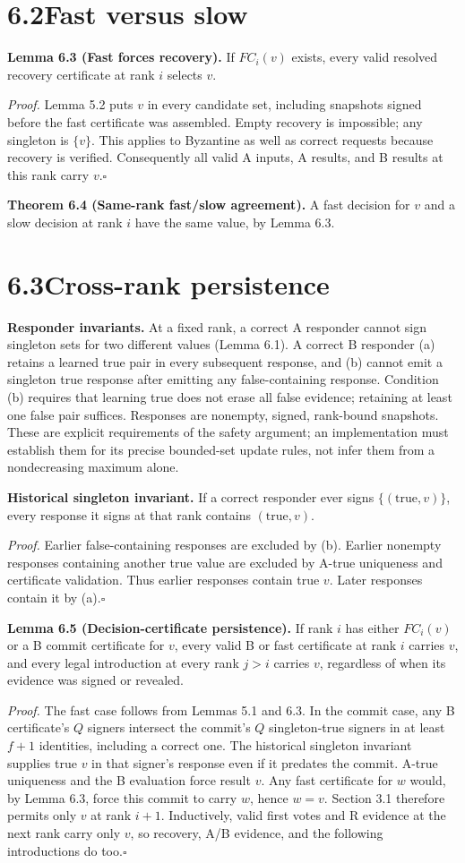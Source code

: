 \documentclass[11pt,a4paper]{article}
\newcommand{\claim}[2]{\par\textbf{#1.} #2\par}
\begin{document}
\section*{6.2\quad Fast versus slow}
\claim{Lemma 6.3 (Fast forces recovery)}{If $FC_i(v)$ exists, every valid resolved recovery certificate at rank $i$ selects $v$.}
\textit{Proof.} Lemma 5.2 puts $v$ in every candidate set, including snapshots signed before the fast certificate was assembled. Empty recovery is impossible; any singleton is $\{v\}$. This applies to Byzantine as well as correct requests because recovery is verified. Consequently all valid A inputs, A results, and B results at this rank carry $v$.\hfill$\square$
\claim{Theorem 6.4 (Same-rank fast/slow agreement)}{A fast decision for $v$ and a slow decision at rank $i$ have the same value, by Lemma 6.3.}
\section*{6.3\quad Cross-rank persistence}
\textbf{Responder invariants.} At a fixed rank, a correct A responder cannot sign singleton sets for two different values (Lemma 6.1). A correct B responder (a) retains a learned true pair in every subsequent response, and (b) cannot emit a singleton true response after emitting any false-containing response. Condition (b) requires that learning true does not erase all false evidence; retaining at least one false pair suffices. Responses are nonempty, signed, rank-bound snapshots. These are explicit requirements of the safety argument; an implementation must establish them for its precise bounded-set update rules, not infer them from a nondecreasing maximum alone.

\claim{Historical singleton invariant}{If a correct responder ever signs $\{(\mathrm{true},v)\}$, every response it signs at that rank contains $(\mathrm{true},v)$.}
\textit{Proof.} Earlier false-containing responses are excluded by (b). Earlier nonempty responses containing another true value are excluded by A-true uniqueness and certificate validation. Thus earlier responses contain true $v$. Later responses contain it by (a).\hfill$\square$

\claim{Lemma 6.5 (Decision-certificate persistence)}{If rank $i$ has either $FC_i(v)$ or a B commit certificate for $v$, every valid B or fast certificate at rank $i$ carries $v$, and every legal introduction at every rank $j>i$ carries $v$, regardless of when its evidence was signed or revealed.}
\textit{Proof.} The fast case follows from Lemmas 5.1 and 6.3. In the commit case, any B certificate's $Q$ signers intersect the commit's $Q$ singleton-true signers in at least $f+1$ identities, including a correct one. The historical singleton invariant supplies true $v$ in that signer's response even if it predates the commit. A-true uniqueness and the B evaluation force result $v$. Any fast certificate for $w$ would, by Lemma 6.3, force this commit to carry $w$, hence $w=v$. Section 3.1 therefore permits only $v$ at rank $i+1$. Inductively, valid first votes and R evidence at the next rank carry only $v$, so recovery, A/B evidence, and the following introductions do too.\hfill$\square$
\end{document}

